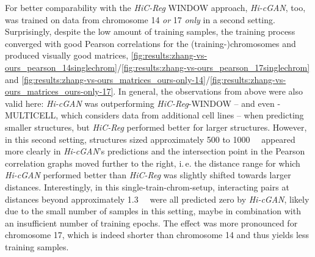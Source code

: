 For better comparability with the \emph{HiC-Reg} WINDOW approach, \emph{Hi-cGAN}, too, was trained on data from chromosome 14 \emph{or} 17 \emph{only} in a second setting.
Surprisingly, despite the low amount of training samples, the training process converged with good Pearson correlations for the (training\mbox{-})chromosomes and 
produced visually good matrices, \cref{fig:results:zhang-vs-ours_pearson_14singlechrom}/\ref{fig:results:zhang-vs-ours_pearson_17singlechrom} 
and \ref{fig:results:zhang-vs-ours_matrices_ours-only-14}/\ref{fig:results:zhang-vs-ours_matrices_ours-only-17}.
In general, the observations from above were also valid here: \emph{Hi-cGAN} was outperforming \emph{HiC-Reg}-WINDOW -- and even -MULTICELL, which considers data from additional cell lines -- 
when predicting smaller structures, but \emph{HiC-Reg} performed better for larger structures.
However, in this second setting, structures sized approximately 500 to \SI{1000}{\kilo\bp} appeared more clearly in \emph{Hi-cGAN}'s predictions 
and the intersection point in the Pearson correlation graphs moved further to the right, i.\,e. the distance range for which \emph{Hi-cGAN} performed
better than \emph{HiC-Reg} was slightly shifted towards larger distances.
Interestingly, in this single-train-chrom-setup, interacting pairs at distances beyond approximately \SI{1.3}{\kilo\bp} were all predicted zero by \emph{Hi-cGAN}, 
likely due to the small number of samples in this setting, maybe in combination with an insufficient number of training epochs. 
The effect was more pronounced for chromosome 17, which is indeed shorter than chromosome 14 and thus yields less training samples.


